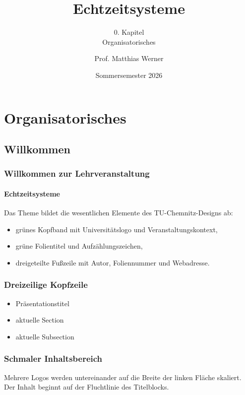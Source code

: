 \documentclass{ltx-talk}
\title{Echtzeitsysteme}
\subtitle{0. Kapitel\\Organisatorisches}
\author{Prof. Matthias Werner}
\institute{Professur Betriebssysteme}
\date{Sommersemester 2026}
\begin{document}

\maketuctitle

\section{Organisatorisches}

\subsection{Willkommen}


\begin{frame}
  \frametitle{Willkommen zur Lehrveranstaltung}
  \framesubtitle{Echtzeitsysteme}

  Das Theme bildet die wesentlichen Elemente des TU-Chemnitz-Designs ab:
  \begin{itemize}
    \item grünes Kopfband mit Universitätslogo und Veranstaltungskontext,
    \item grüne Folientitel und Aufzählungszeichen,
    \item dreigeteilte Fußzeile mit Autor, Foliennummer und Webadresse.
  \end{itemize}
\end{frame}

\tucthreeheader
\begin{frame}
  \frametitle{Dreizeilige Kopfzeile}
  \begin{itemize}
    \item Präsentationstitel
    \item aktuelle Section
    \item aktuelle Subsection
  \end{itemize}
\end{frame}

\tucnarrowframe
\begin{frame}
  \frametitle{Schmaler Inhaltsbereich}
  Mehrere Logos werden untereinander auf die Breite der linken Fläche
  skaliert. Der Inhalt beginnt auf der Fluchtlinie des Titelblocks.
\end{frame}

\tucwideframe
\tuctwoheader
{}
\maketitle[talk]

\maketitle[image]
\end{document}
